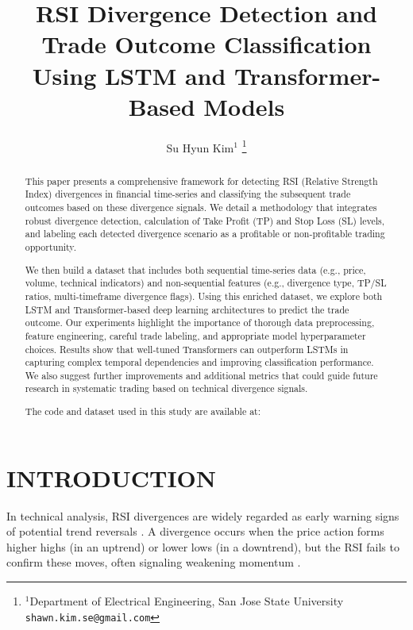 \documentclass[letterpaper, 10 pt, conference]{ieeeconf}  %
\title{\LARGE \bf
RSI Divergence Detection and Trade Outcome Classification Using LSTM and Transformer-Based Models
}
\author{Su Hyun Kim$^{1}$ %
\thanks{$^{1}$Department of Electrical Engineering,
        San Jose State University
        {\tt\small shawn.kim.se@gmail.com}}%
}
\begin{document}
\maketitle
\thispagestyle{empty}
\pagestyle{empty}

\begin{abstract}
This paper presents a comprehensive framework for detecting RSI (Relative Strength Index) divergences in financial time-series and classifying the subsequent trade outcomes based on these divergence signals. We detail a methodology that integrates robust divergence detection, calculation of Take Profit (TP) and Stop Loss (SL) levels, and labeling each detected divergence scenario as a profitable or non-profitable trading opportunity.

We then build a dataset that includes both sequential time-series data (e.g., price, volume, technical indicators) and non-sequential features (e.g., divergence type, TP/SL ratios, multi-timeframe divergence flags). Using this enriched dataset, we explore both LSTM and Transformer-based deep learning architectures to predict the trade outcome. Our experiments highlight the importance of thorough data preprocessing, feature engineering, careful trade labeling, and appropriate model hyperparameter choices. Results show that well-tuned Transformers can outperform LSTMs in capturing complex temporal dependencies and improving classification performance. We also suggest further improvements and additional metrics that could guide future research in systematic trading based on technical divergence signals.

The code and dataset used in this study are available at: \href{https://github.com/Shawn-Kim96/rsi_divergence_detector/}{\faGitSquare}
\end{abstract}

\section{INTRODUCTION}

In technical analysis, RSI divergences are widely regarded as early warning signs of potential trend reversals \cite{c1,c2}. A divergence occurs when the price action forms higher highs (in an uptrend) or lower lows (in a downtrend), but the RSI fails to confirm these moves, often signaling weakening momentum \cite{c1}.
\end{document}
